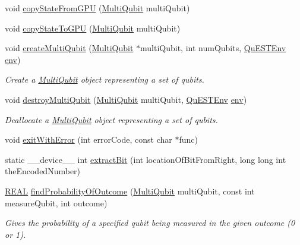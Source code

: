 \begin{DoxyCompactItemize}
\item 
void \mbox{\hyperlink{QuEST__env__localGPU_8cu_a0d255fec1e375244d4cb980fac92621d}{copy\+State\+From\+G\+PU}} (\mbox{\hyperlink{structMultiQubit}{Multi\+Qubit}} multi\+Qubit)
\item 
void \mbox{\hyperlink{QuEST__env__localGPU_8cu_a5b8880e65a521b4f6445af21b68d88ef}{copy\+State\+To\+G\+PU}} (\mbox{\hyperlink{structMultiQubit}{Multi\+Qubit}} multi\+Qubit)
\item 
void \mbox{\hyperlink{QuEST__env__localGPU_8cu_a9c02591bc64c2918503afa231d90d83f}{create\+Multi\+Qubit}} (\mbox{\hyperlink{structMultiQubit}{Multi\+Qubit}} $\ast$multi\+Qubit, int num\+Qubits, \mbox{\hyperlink{structQuESTEnv}{Qu\+E\+S\+T\+Env}} \mbox{\hyperlink{runTests_8c_a5fd8ba97fcae3408ae6221dfc3cc1f93}{env}})
\begin{DoxyCompactList}\small\item\em Create a \mbox{\hyperlink{structMultiQubit}{Multi\+Qubit}} object representing a set of qubits. \end{DoxyCompactList}\item 
void \mbox{\hyperlink{QuEST__env__localGPU_8cu_ae5d6acc322314d7a3d8a2eccf00d3b19}{destroy\+Multi\+Qubit}} (\mbox{\hyperlink{structMultiQubit}{Multi\+Qubit}} multi\+Qubit, \mbox{\hyperlink{structQuESTEnv}{Qu\+E\+S\+T\+Env}} \mbox{\hyperlink{runTests_8c_a5fd8ba97fcae3408ae6221dfc3cc1f93}{env}})
\begin{DoxyCompactList}\small\item\em Deallocate a \mbox{\hyperlink{structMultiQubit}{Multi\+Qubit}} object representing a set of qubits. \end{DoxyCompactList}\item 
void \mbox{\hyperlink{QuEST__env__localGPU_8cu_ae5f9019826f35e8b51b1716cfe397b45}{exit\+With\+Error}} (int error\+Code, const char $\ast$func)
\item 
static \+\_\+\+\_\+device\+\_\+\+\_\+ int \mbox{\hyperlink{QuEST__env__localGPU_8cu_a6ffa51987d8ad8f6c0fc07fd3492277f}{extract\+Bit}} (int location\+Of\+Bit\+From\+Right, long long int the\+Encoded\+Number)
\item 
\mbox{\hyperlink{QuEST__precision_8h_a4b654506f18b8bfd61ad2a29a7e38c25}{R\+E\+AL}} \mbox{\hyperlink{QuEST__env__localGPU_8cu_ad315c941a51bc053d39ebfa2040fd32e}{find\+Probability\+Of\+Outcome}} (\mbox{\hyperlink{structMultiQubit}{Multi\+Qubit}} multi\+Qubit, const int measure\+Qubit, int outcome)
\begin{DoxyCompactList}\small\item\em Gives the probability of a specified qubit being measured in the given outcome (0 or 1). \end{DoxyCompactList}\item 

\end{DoxyCompactItemize}
